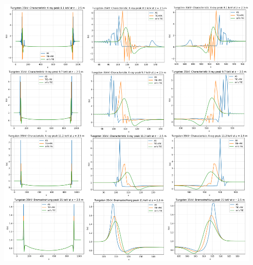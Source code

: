\documentclass[10pt, a4paper, singlespacing]{report}
\newenvironment{Figure}
    {\par\medskip\noindent\minipage{\linewidth}}
    {\endminipage\par\medskip}
\begin{document}
\begin{Figure}\label{fig:7}  
 \centering
  \hspace*{-0.9cm}
 \includegraphics[width=1.1\linewidth]{AS_vs_TIE+RK_vs_TIE_2.pdf}
\end{Figure}

\end{document}
